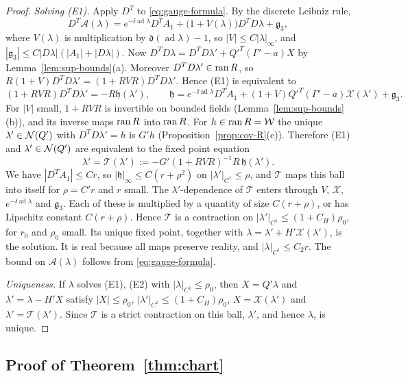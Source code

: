 \begin{proof}
\emph{Solving (E1).} Apply $D^T$ to \eqref{eq:gauge-formula}. By the discrete Leibniz rule,
\[
D^T\mathcal A(\lambda)=e^{-\ii\operatorname{ad}\lambda}D^TA_1+\big(1+V(\lambda)\big)D^TD\lambda+\mathfrak g_3,
\]
where $V(\lambda)$ is multiplication by $\mathfrak d(\operatorname{ad}\lambda)-1$, so $|V|\le C|\lambda|_\infty$, and $|\mathfrak g_3|\le C|D\lambda|(|A_1|+|D\lambda|)$. Now $D^TD\lambda=D^TD\lambda'+Q'^T(\Gamma'-a)X$ by Lemma~\ref{lem:sup-bounds}(a). Moreover $D^TD\lambda'\in\operatorname{ran} R$, so $R(1+V)D^TD\lambda'=(1+RVR)D^TD\lambda'$. Hence (E1) is equivalent to
\[
(1+RVR)D^TD\lambda'=-R\mathfrak h(\lambda'),\qquad\mathfrak h=e^{-\ii\operatorname{ad}\lambda}D^TA_1+(1+V)Q'^T(\Gamma'-a)\mathcal X(\lambda')+\mathfrak g_3 .
\]
For $|V|$ small, $1+RVR$ is invertible on bounded fields (Lemma~\ref{lem:sup-bounds}(b)), and its inverse maps $\operatorname{ran} R$ into $\operatorname{ran} R$. For $h\in\operatorname{ran} R=\mathcal W$ the unique $\lambda'\in\mathcal N(Q')$ with $D^TD\lambda'=h$ is $G'h$ (Proposition~\ref{prop:cov-R}(c)). Therefore (E1) and $\lambda'\in\mathcal N(Q')$ are equivalent to the fixed point equation
\[
\lambda'=\mathcal T(\lambda'):=-G'(1+RVR)^{-1}R\,\mathfrak h(\lambda').
\]
We have $|D^TA_1|\le Cr$, so $|\mathfrak h|_\infty\le C(r+\rho^2)$ on $|\lambda'|_{C^1}\le\rho$, and $\mathcal T$ maps this ball into itself for $\rho=C'r$ and $r$ small. The $\lambda'$-dependence of $\mathcal T$ enters through $V$, $\mathcal X$, $e^{-\ii\operatorname{ad}\lambda}$ and $\mathfrak g_3$. Each of these is multiplied by a quantity of size $C(r+\rho)$, or has Lipschitz constant $C(r+\rho)$. Hence $\mathcal T$ is a contraction on $|\lambda'|_{C^1}\le(1+C_H)\rho_0$, for $r_0$ and $\rho_0$ small. Its unique fixed point, together with $\lambda=\lambda'+H'\mathcal X(\lambda')$, is the solution. It is real because all maps preserve reality, and $|\lambda|_{C^1}\le C_2r$. The bound on $\mathcal A(\lambda)$ follows from \eqref{eq:gauge-formula}.

\emph{Uniqueness.} If $\lambda$ solves (E1), (E2) with $|\lambda|_{C^1}\le\rho_0$, then $X=Q'\lambda$ and $\lambda'=\lambda-H'X$ satisfy $|X|\le\rho_0$, $|\lambda'|_{C^1}\le(1+C_H)\rho_0$, $X=\mathcal X(\lambda')$ and $\lambda'=\mathcal T(\lambda')$. Since $\mathcal T$ is a strict contraction on this ball, $\lambda'$, and hence $\lambda$, is unique.
\end{proof}

\subsection{Proof of Theorem~\ref{thm:chart}}

